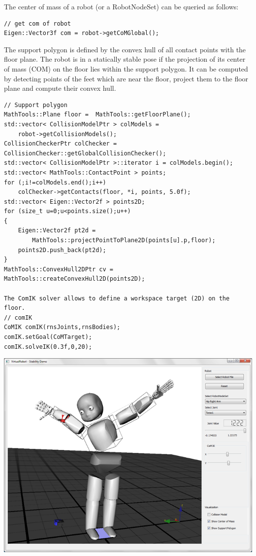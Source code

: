 \documentclass{book}
\begin{document}
The center of mass of a robot (or a RobotNodeSet) can be queried as follows: 
\begin{lstlisting}
// get com of robot
Eigen::Vector3f com = robot->getCoMGlobal();
\end{lstlisting}
The support polygon is defined by the convex hull of all contact points with the floor plane. The robot is in a statically stable pose if the projection of its center of mass (COM) on the floor lies within the support polygon. It can be computed by detecting points of the feet which are near the floor, project them to the floor plane and compute their convex hull.
\begin{lstlisting}
// Support polygon
MathTools::Plane floor =  MathTools::getFloorPlane();
std::vector< CollisionModelPtr > colModels =  
    robot->getCollisionModels();
CollisionCheckerPtr colChecker = CollisionChecker::getGlobalCollisionChecker();
std::vector< CollisionModelPtr >::iterator i = colModels.begin();
std::vector< MathTools::ContactPoint > points;
for (;i!=colModels.end();i++)
    colChecker->getContacts(floor, *i, points, 5.0f);
std::vector< Eigen::Vector2f > points2D;
for (size_t u=0;u<points.size();u++)
{
    Eigen::Vector2f pt2d = 
        MathTools::projectPointToPlane2D(points[u].p,floor);
    points2D.push_back(pt2d);
}
MathTools::ConvexHull2DPtr cv = MathTools::createConvexHull2D(points2D);

The ComIK solver allows to define a workspace target (2D) on the floor.
// comIK
CoMIK comIK(rnsJoints,rnsBodies);
comIK.setGoal(CoMTarget);
comIK.solveIK(0.3f,0,20);
\end{lstlisting}
\includegraphics[width=\textwidth]{StabilityDemo}
\end{document}
